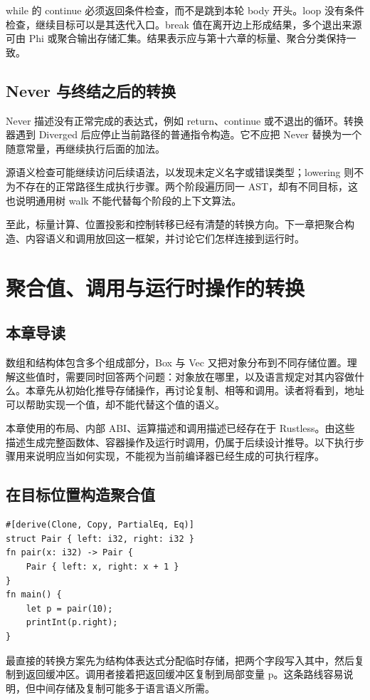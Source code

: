 while 的 continue 必须返回条件检查，而不是跳到本轮 body 开头。loop 没有条件检查，继续目标可以是其迭代入口。break 值在离开边上形成结果，多个退出来源可由 Phi 或聚合输出存储汇集。结果表示应与第十六章的标量、聚合分类保持一致。

\section{Never 与终结之后的转换}
Never 描述没有正常完成的表达式，例如 return、continue 或不退出的循环。转换器遇到 Diverged 后应停止当前路径的普通指令构造。它不应把 Never 替换为一个随意常量，再继续执行后面的加法。

源语义检查可能继续访问后续语法，以发现未定义名字或错误类型；lowering 则不为不存在的正常路径生成执行步骤。两个阶段遍历同一 AST，却有不同目标，这也说明通用树 walk 不能代替每个阶段的上下文算法。

至此，标量计算、位置投影和控制转移已经有清楚的转换方向。下一章把聚合构造、内容语义和调用放回这一框架，并讨论它们怎样连接到运行时。

\chapter{聚合值、调用与运行时操作的转换}
\label{chap:aggregate-calls}
\section*{本章导读}
数组和结构体包含多个组成部分，Box 与 Vec 又把对象分布到不同存储位置。理解这些值时，需要同时回答两个问题：对象放在哪里，以及语言规定对其内容做什么。本章先从初始化推导存储操作，再讨论复制、相等和调用。读者将看到，地址可以帮助实现一个值，却不能代替这个值的语义。

本章使用的布局、内部 ABI、运算描述和调用描述已经存在于 Rustless。由这些描述生成完整函数体、容器操作及运行时调用，仍属于后续设计推导。以下执行步骤用来说明应当如何实现，不能视为当前编译器已经生成的可执行程序。

\section{在目标位置构造聚合值}
\begin{lstlisting}[language=Rustless,caption={聚合初始化与聚合返回共用的构造问题}]
#[derive(Clone, Copy, PartialEq, Eq)]
struct Pair { left: i32, right: i32 }
fn pair(x: i32) -> Pair {
    Pair { left: x, right: x + 1 }
}
fn main() {
    let p = pair(10);
    printInt(p.right);
}
\end{lstlisting}
最直接的转换方案先为结构体表达式分配临时存储，把两个字段写入其中，然后复制到返回缓冲区。调用者接着把返回缓冲区复制到局部变量 p。这条路线容易说明，但中间存储及复制可能多于语言语义所需。

